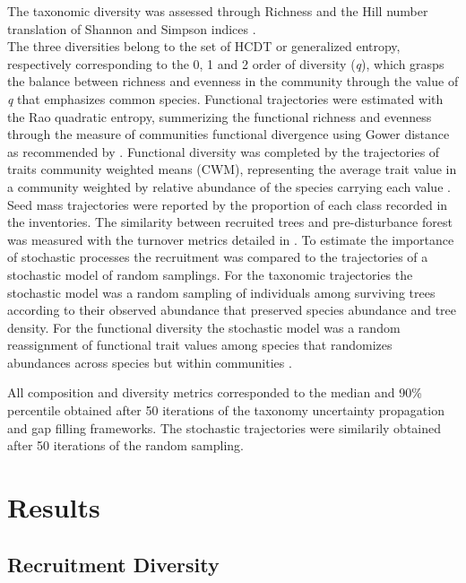 \documentclass[fleqn,10pt]{ArtEcoFoG} %
\begin{document}
The taxonomic diversity was assessed through Richness and the Hill
number translation of Shannon and Simpson indices
\citep{Hill1973, chao2015estimating, Marcon2015b}.\\
The three diversities belong to the set of HCDT or generalized entropy,
respectively corresponding to the 0, 1 and 2 order of diversity
(\emph{q}), which grasps the balance between richness and evenness in
the community through the value of \emph{q} that emphasizes common
species. Functional trajectories were estimated with the Rao quadratic
entropy, summerizing the functional richness and evenness
\citep{Clark2012} through the measure of communities functional
divergence using Gower distance as recommended by \citet{Pavoine2009}.
Functional diversity was completed by the trajectories of traits
community weighted means (CWM), representing the average trait value in
a community weighted by relative abundance of the species carrying each
value \citep{Diaz2007, Garnier2004, Mason2013}. Seed mass trajectories
were reported by the proportion of each class recorded in the
inventories. The similarity between recruited trees and pre-disturbance
forest was measured with the turnover metrics detailed in
\citet{Podani2013a}. To estimate the importance of stochastic processes
the recruitment was compared to the trajectories of a stochastic model
of random samplings. For the taxonomic trajectories the stochastic model
was a random sampling of individuals among surviving trees according to
their observed abundance that preserved species abundance and tree
density. For the functional diversity the stochastic model was a random
reassignment of functional trait values among species that randomizes
abundances across species but within communities \citep{Mason2013}.

All composition and diversity metrics corresponded to the median and
90\% percentile obtained after 50 iterations of the taxonomy uncertainty
propagation and gap filling frameworks. The stochastic trajectories were
similarily obtained after 50 iterations of the random sampling.

\section{Results}\label{results}

\subsection{Recruitment Diversity}\label{recruitment-diversity}
\end{document}

